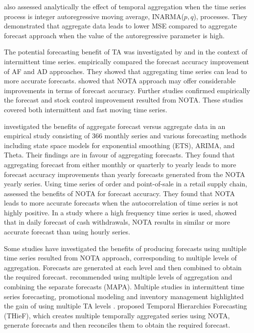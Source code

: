 \documentclass[preprint, 3p,
authoryear]{elsarticle} %
\begin{document}
\citet{mohammadipour2012forecast} also assessed analytically the effect
of temporal aggregation when the time series process is integer
autoregressive moving average, INARMA(\(p,q\)), processes. They
demonstrated that aggregate data leads to lower MSE compared to
aggregate forecast approach when the value of the autoregressive
parameter is high.

The potential forecasting benefit of TA was investigated by
\citet{willemain1994forecasting} and \citet{nikolopoulos2011aggregate}
in the context of intermittent time series.
\citet{willemain1994forecasting} empirically compared the forecast
accuracy improvement of AF and AD approaches. They showed that
aggregating time series can lead to more accurate forecasts.
\citet{nikolopoulos2011aggregate} showed that NOTA approach may offer
considerable improvements in terms of forecast accuracy. Further studies
\citep{babai2012impact, petropoulos2015forecast, kourentzes2014improving, spithourakis2011improving}
confirmed empirically the forecast and stock control improvement
resulted from NOTA. These studies covered both intermittent and fast
moving time series.

\citet{athanasopoulos2011tourism} investigated the benefits of aggregate
forecast versus aggregate data in an empirical study consisting of 366
monthly series and various forecasting methods including state space
models for exponential smoothing (ETS), ARIMA, and Theta. Their findings
are in favour of aggregating forecasts. They found that aggregating
forecast from either monthly or quarterly to yearly leads to more
forecast accuracy improvements than yearly forecasts generated from the
NOTA yearly series. Using time series of order and point-of-sale in a
retail supply chain, \citet{jin2015forecasting} assessed the benefits of
NOTA for forecast accuracy. They found that NOTA leads to more accurate
forecasts when the autocorrelation of time series is not highly
positive. In a study where a high frequency time series is used,
\citet{luna2011top} showed that in daily forecast of cash withdrawals,
NOTA results in similar or more accurate forecast than using hourly
series.

Some studies have investigated the benefits of producing forecasts using
multiple time series resulted from NOTA approach, corresponding to
multiple levels of aggregation. Forecasts are generated at each level
and then combined to obtain the required forecast.
\citet{kourentzes2014improving} recommended using multiple levels of
aggregation and combining the separate forecasts (MAPA). Multiple
studies in intermittent time series forecasting, promotional modeling
and inventory management highlighted the gain of using multiple TA
levels
\citep{petropoulos2014forecast, kourentzes2015forecasting, barrow2016distributions}.
\citet{athanasopoulos2017forecasting} proposed Temporal Hierarchies
Forecasting (THieF), which creates multiple temporally aggregated series
using NOTA, generate forecasts and then reconciles them to obtain the
required forecast.
\end{document}
